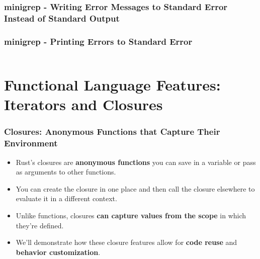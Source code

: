 \documentclass{beamer}
\begin{document}
\begin{frame}[fragile]
	\frametitle{minigrep - Writing Error Messages to Standard Error Instead of Standard Output}
\end{frame}

\begin{frame}[fragile]
	\frametitle{minigrep - Printing Errors to Standard Error}
	\inputminted{rust}{./code/grep14.rs}

\end{frame}

\section{Functional Language Features: Iterators and Closures}


\begin{frame}[fragile]
	\frametitle{Closures: Anonymous Functions that Capture Their Environment}
\begin{itemize}
	\item Rust’s closures are \textbf{anonymous functions} you can save in a variable or pass as arguments to other functions. 
	\item You can create the closure in one place and then call the closure elsewhere to evaluate it in a different context.
	\item  Unlike functions, closures \textbf{can capture values from the scope} in which they’re defined. 
	\item  We’ll demonstrate how these closure features allow for \textbf{code reuse} and \textbf{behavior customization}.
\end{itemize}
\end{frame}
\end{document}
